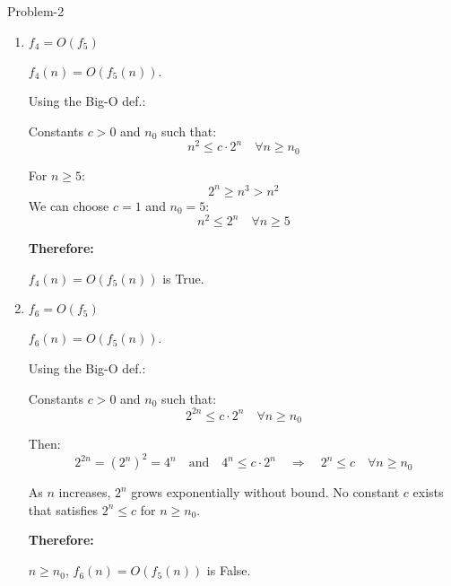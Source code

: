 \begin{problem}{}{Problem-2}
\begin{enumerate}[label=(\alph*)]
		\item \textbf{\(f_4 = O(f_5)\)}
		
		\(f_4(n) = O(f_5(n))\).
		
		Using the Big-O def.:
		
		Constants \(c > 0\) and \(n_0\) such that:
		\[
		n^2 \leq c \cdot 2^n \quad \forall n \geq n_0
		\]
		
		For \(n \geq 5\):
		\[
		2^n \geq n^3 > n^2
		\]
		We can choose \(c = 1\) and \(n_0 = 5\):
		\[
		n^2 \leq 2^n \quad \forall n \geq 5
		\]
		
		\textbf{Therefore:}
		
		\(f_4(n) = O(f_5(n))\) is True.
		
		\item \textbf{\(f_6 = O(f_5)\)}
		
		\(f_6(n) = O(f_5(n))\).
		
		Using the Big-O def.:
		
		Constants \(c > 0\) and \(n_0\) such that:
		\[
		2^{2n} \leq c \cdot 2^n \quad \forall n \geq n_0
		\]
		
		Then:
		\[
		2^{2n} = (2^n)^2 = 4^n \quad \text{and} \quad 4^n \leq c \cdot 2^n \quad \Rightarrow \quad 2^n \leq c \quad \forall n \geq n_0
		\]
		
		As \(n\) increases, \(2^n\) grows exponentially without bound. No constant \(c\) exists that satisfies \(2^n \leq c\) for \(n \geq n_0\).
		
		\textbf{Therefore:}
		
		 \(n \geq n_0\), \(f_6(n) = O(f_5(n))\) is False.
		
	\end{enumerate}
\end{problem}

